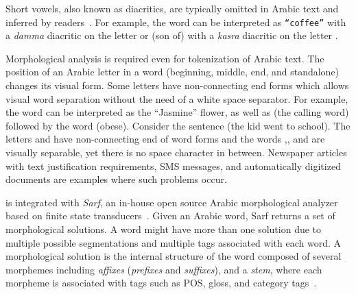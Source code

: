 \vocalize

\def\pp{\ensuremath{{\cal P}}} %
\def\ss{\ensuremath{{\cal S}}} %
\def\xx{\ensuremath{{\cal X}}} %
\def\PP{\ensuremath{\mathit{POS}}} %
\def\GG{\ensuremath{\mathit{GLOSS}}} %
\def\AC{\ensuremath{\mathit{CAT}}} %

Short vowels, also known as diacritics, are typically omitted in Arabic text
and inferred by readers~\cite{habash2006arabic}. 
For example, the word %
can be interpreted as  {\tt ``coffee''} with a {\em damma} diacritic on the 
letter  or 
\vocalize {} (son of) with a 
{\em kasra} diacritic on the letter .

Morphological analysis is required even for tokenization of Arabic text. 
The position of an Arabic letter in a word 
(beginning, middle, end, and standalone) changes
its visual form.
Some letters have non-connecting end forms which allows visual
word separation without the need of a white space separator. 
For example, the word  can be interpreted as
the ``Jasmine'' flower, 
as well as  (the calling word) followed by
the word  (obese). 
Consider the sentence 
\arabfalse {} \arabtrue
(the kid went to school). 
The letters  and  have 
non-connecting end of word forms and the words 
,, and 
are visually separable, 
yet there is no space character in between.
Newspaper articles with text justification requirements, 
SMS messages, and automatically digitized documents
are examples where such problems occur. 

\framework is integrated with {\em Sarf}, 
an in-house open source Arabic morphological analyzer based on 
finite state transducers~\cite{ZaMaColing2012DemosSarf}. 
Given an Arabic word, Sarf returns 
a set of morphological solutions. 
A word might have more than one solution 
due to multiple possible segmentations and multiple tags associated 
with each word. 
A morphological solution is the internal structure of the word 
composed of several morphemes including 
{\em affixes} ({\em prefixes} and {\em suffixes}), and a
{\em stem}, where each morpheme is associated with tags such as 
POS, gloss, and category tags~\cite{arabicmorph,habash2010introduction}.


